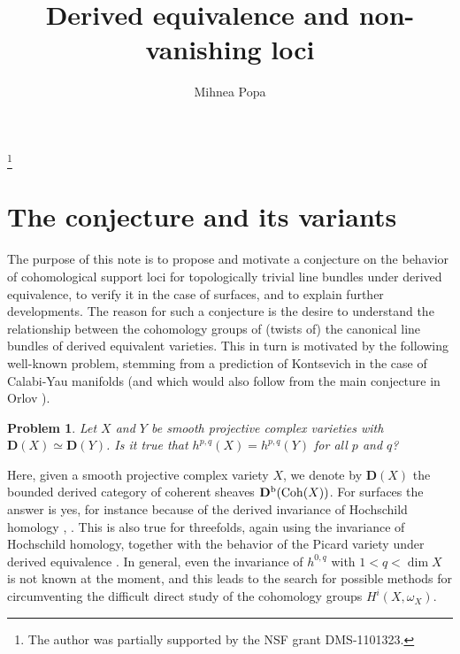 \documentclass{amsart}
\theoremstyle{plain}
\newtheorem{problem}[theorem]{Problem}
\theoremstyle{definition}
\numberwithin{equation}{section}
\begin{document}
\title[Derived equivalence and non-vanishing loci]{Derived 
equivalence and non-vanishing loci}

\author{Mihnea Popa}
\address{Department of Mathematics, University of Illinois at Chicago,
851 S. Morgan Street, Chicago, IL 60607, USA } 
\thanks{The author was partially supported by the NSF grant DMS-1101323.}

\setlength{\parskip}{.09 in}


\maketitle

\section{The conjecture and its variants}

The purpose of this note is to propose and motivate a conjecture on the behavior of cohomological support loci for topologically trivial line bundles under derived equivalence, to verify it in the case of surfaces, and to explain further developments.
The reason for such a conjecture is the desire to understand the relationship between the cohomology groups of (twists of) the canonical line bundles of  derived equivalent varieties. This in turn is motivated by the following well-known problem, stemming from a prediction of Kontsevich in the case of Calabi-Yau manifolds (and which would also follow from the main conjecture in Orlov \cite{orlov2}).

\begin{problem}
Let $X$ and $Y$ be smooth projective complex varieties with ${\mathbf{D}}(X) \simeq {\mathbf{D}}(Y)$.  Is it true that
$h^{p,q}(X) = h^{p,q}(Y)$ for all $p$ and  $q$?
\end{problem}

Here, given a smooth projective complex variety $X$, we denote by ${\mathbf{D}}(X)$ the bounded derived 
category of coherent sheaves ${\mathbf{D}}^{{\rm b}} ({\rm Coh}(X))$.  
For surfaces the answer is yes, for instance because of the derived invariance of Hochschild homology \cite{orlov1}, \cite{caldararu}. 
This is also true for threefolds, again using the invariance of Hochschild homology, together 
with the behavior of the Picard variety under derived equivalence \cite{PS}. In general, even the 
invariance of $h^{0, q}$ with $1< q < \dim X$ is not known at the moment, and this leads to the 
search for possible methods for circumventing the difficult direct study of the cohomology groups $H^i (X, \omega_X)$.
\end{document}
